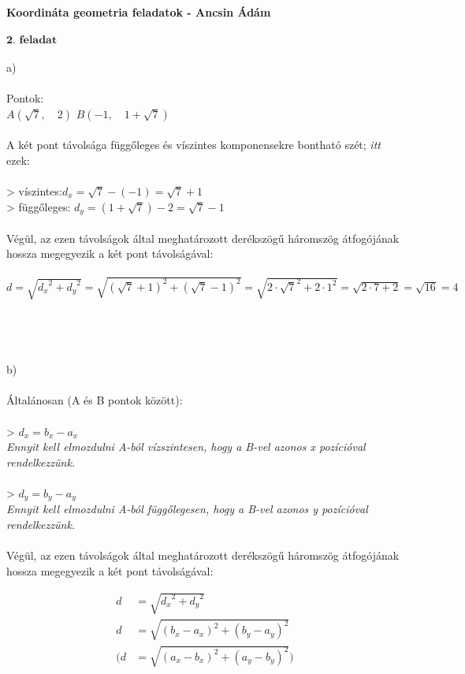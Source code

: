 \documentclass[a4paper,12pt]{article}
\begin{document}
\textbf{Koordináta geometria feladatok - Ancsin Ádám}
\\
\\ \underline{\textit{$\textbf{2. feladat} $}}
\\
\\ a)
\\
\\ Pontok:
\\ $A\left(\sqrt{7}, \quad 2\right)$ \qquad $B\left(-1, \quad 1+\sqrt{7}\right)$
\\
\\ A két pont távolsága függőleges és víszintes komponensekre bontható szét; \textit{itt} ezek:
\\
\\ > víszintes:\quad $d_{x} = \sqrt{7} - (-1) = \sqrt{7} + 1$
\\ > függőleges: $d_{y} = \left(1+ \sqrt{7}\right) - 2 = \sqrt{7} - 1$
\\
\\ Végül, az ezen távolságok által meghatározott derékszögű háromszög átfogójának hossza megegyezik a két pont távolságával:
\\
\\ $d = \sqrt{{d_x}^2 + {d_y}^2} = \sqrt{{\left(\sqrt{7} + 1\right)}^2 + {\left(\sqrt{7} - 1\right)}^2} = \sqrt{2\cdot\sqrt{7}^2 + 2\cdot1^2} = \sqrt{2\cdot7 + 2} = \sqrt{16} =4$
\\
\\ 
\\
\\
\\ b)
\\
\\ Általánosan (A és B pontok között):
\\
\\ > $d_x = b_x - a_x$
\\ \textit{Ennyit kell elmozdulni A-ból vízszintesen, hogy a B-vel azonos x pozícióval rendelkezzünk.}
\\
\\ > $d_y = b_y - a_y$
\\ \textit{Ennyit kell elmozdulni A-ból függőlegesen, hogy a B-vel azonos y pozícióval rendelkezzünk.}
\\
\\ Végül, az ezen távolságok által meghatározott derékszögű háromszög átfogójának hossza megegyezik a két pont távolságával:
\setlength{\abovedisplayskip}{0pt}
\setlength{\belowdisplayskip}{0pt}
\begin{center}
\begin{align*}
d &= \sqrt{{d_x}^2 + {d_y}^2} \\
d &= \sqrt{\left(b_x - a_x\right)^2 + \left(b_y - a_y\right)^2} \\
(d &= \sqrt{\left(a_x - b_x\right)^2 + \left(a_y - b_y\right)^2})
\end{align*}
\end{center}
\end{document}
